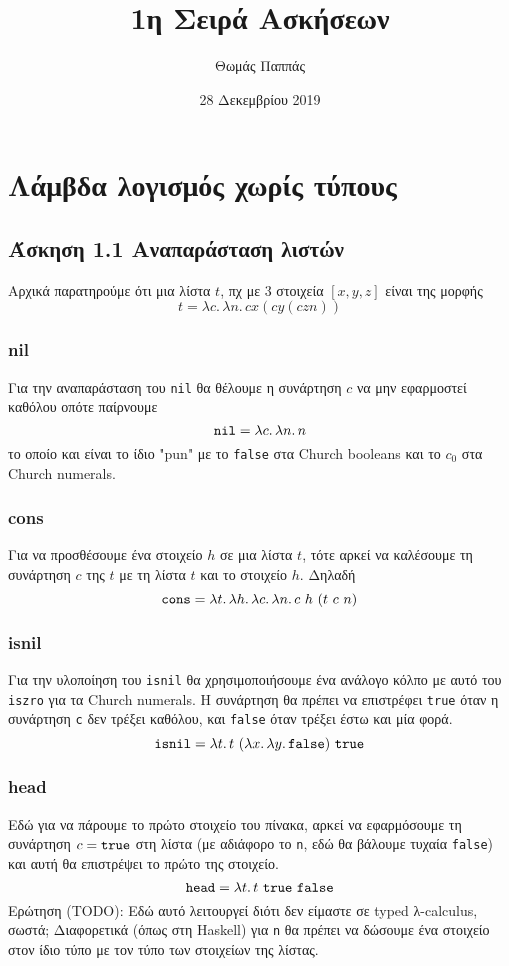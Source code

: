\documentclass[a4paper,11pt]{article}
\newcommand\nlambda[1]{\ensuremath{\lambda #1.\,}}
\begin{document}
\title{1η Σειρά Ασκήσεων}
\author{Θωμάς Παππάς}
\date{28 Δεκεμβρίου 2019}
\maketitle

\section{Λάμβδα λογισμός χωρίς τύπους}


\subsection*{Άσκηση 1.1  Αναπαράσταση λιστών}

Αρχικά παρατηρούμε ότι μια λίστα $t$, πχ με $3$ στοιχεία $[x, y, z]$ είναι της μορφής
$$t = \nlambda{c} \nlambda{n} c x (c y (c z n))$$

\subsubsection*{nil}
Για την αναπαράσταση του \verb|nil| θα θέλουμε η συνάρτηση $c$ να μην εφαρμοστεί καθόλου οπότε παίρνουμε
$$\verb|nil| = \nlambda{c} \nlambda{n} n$$
το οποίο και είναι το ίδιο "pun" με το \verb|false| στα Church booleans και το $c_0$ στα Church numerals.

\subsubsection*{cons}
Για να προσθέσουμε ένα στοιχείο $h$ σε μια λίστα $t$, τότε αρκεί να καλέσουμε τη συνάρτηση $c$ της $t$ με τη λίστα $t$ και το στοιχείο $h$. Δηλαδή
$$\verb|cons| = \nlambda{t} \nlambda{h} \nlambda{c} \nlambda{n} c\ h\ (t\ c\ n)$$

\subsubsection*{isnil}
Για την υλοποίηση του \verb|isnil| θα χρησιμοποιήσουμε ένα ανάλογο κόλπο με αυτό του \verb|iszro| για τα Church numerals. Η συνάρτηση θα πρέπει να επιστρέφει \verb|true| όταν η συνάρτηση \verb|c| δεν τρέξει καθόλου, και \verb|false| όταν τρέξει έστω και μία φορά.
$$\verb|isnil| = \nlambda{t} t\ (\nlambda{x} \nlambda{y} \verb|false|)\ \verb|true|$$

\subsubsection*{head}
Εδώ για να πάρουμε το πρώτο στοιχείο του πίνακα, αρκεί να εφαρμόσουμε τη συνάρτηση $c= \verb|true|$ στη λίστα (με αδιάφορο το \verb|n|, εδώ θα βάλουμε τυχαία \verb|false|) και αυτή θα επιστρέψει το πρώτο της στοιχείο.
$$\verb|head| = \nlambda{t} t\ \verb|true|\ \verb|false|$$
Ερώτηση (TODO): Εδώ αυτό λειτουργεί διότι δεν είμαστε σε typed λ-calculus, σωστά; Διαφορετικά (όπως στη Haskell) για \verb|n| θα πρέπει να δώσουμε ένα στοιχείο στον ίδιο τύπο με τον τύπο των στοιχείων της λίστας.
\end{document}
